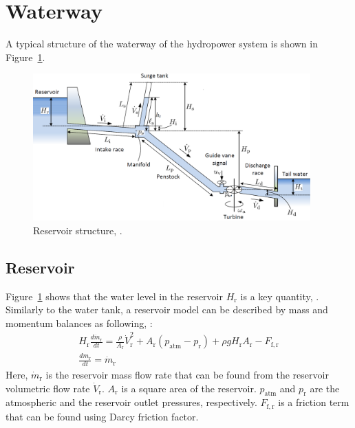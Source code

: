 \documentclass[%
]{USN-PhD}
\begin{document}
\section{Waterway}

A typical structure of the waterway of the hydropower system is shown in Figure~\ref{fig:fig7}.

\begin{figure}[!ht]
  \centering
 \includegraphics[width=0.95\textwidth]{fig/Fig_1_scheme}
 \caption{Reservoir structure, \cite{LieL:18}.}
  \label{fig:fig7}
\end{figure}

\subsection{Reservoir}

Figure~\ref{fig:fig7} shows that the water level in the reservoir $H_\mathrm{r}$ is a key quantity, \cite{Val:17}. Similarly to the water tank, a reservoir model can be described by mass and momentum balances as following, \cite{Sha:11}:
\begin{equation}
\begin{array}{c}
    H_\mathrm{r}\frac{d\dot{m}_\mathrm{r}}{dt}=\frac{\rho}{A_\mathrm{r}}\dot{V}_\mathrm{r}^2+A_\mathrm{r}\left(p_\mathrm{atm}-p_\mathrm{r}\right)+\rho gH_\mathrm{r}A_\mathrm{r}-F_\mathrm{f,r}\\
    \frac{dm_\mathrm{r}}{dt}=\dot{m}_\mathrm{r}
\end{array}
\end{equation}
Here, $\dot{m}_\mathrm{r}$ is the reservoir mass flow rate that can be found from the reservoir volumetric flow rate $\dot{V}_\mathrm{r}$. $A_\mathrm{r}$ is a square area of the reservoir. $p_\mathrm{atm}$ and $p_\mathrm{r}$ are the atmospheric and the reservoir outlet pressures, respectively. $F_\mathrm{f,r}$ is a friction term that can be found using Darcy friction factor.
\end{document}
